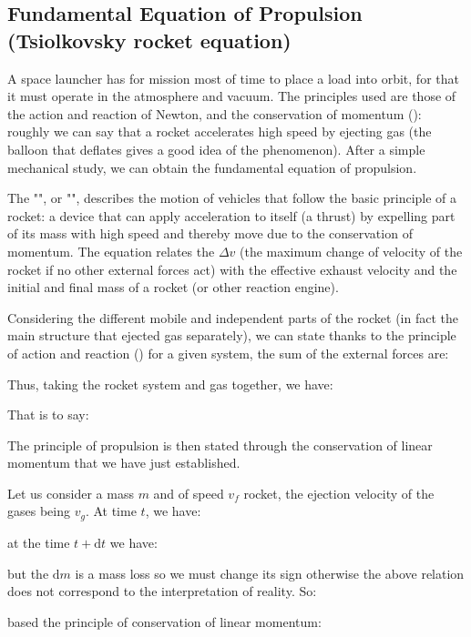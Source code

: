 	
	\subsection{Fundamental Equation of Propulsion (Tsiolkovsky rocket equation)}
	A space launcher has for mission most of time to place a load into orbit, for that it must operate in the atmosphere and vacuum. The principles used are those of the action and reaction of Newton, and the conservation of momentum (): roughly we can say that a rocket accelerates high speed by ejecting gas (the balloon that deflates gives a good idea of the phenomenon). After a simple mechanical study, we can obtain the fundamental equation of propulsion.
	
	The "", or "", describes the motion of vehicles that follow the basic principle of a rocket: a device that can apply acceleration to itself (a thrust) by expelling part of its mass with high speed and thereby move due to the conservation of momentum. The equation relates the $\Delta v$ (the maximum change of velocity of the rocket if no other external forces act) with the effective exhaust velocity and the initial and final mass of a rocket (or other reaction engine).
	
	Considering the different mobile and independent parts of the rocket (in fact the main structure that ejected gas separately), we can state thanks to the principle of action and reaction () for a given system, the sum of the external forces are:
	
	Thus, taking the rocket system and gas together, we have:
	
	That is to say:
	
	The principle of propulsion is then stated through the conservation of linear momentum that we have just established.
	
	Let us consider a mass $m$ and of speed $v_f$ rocket, the ejection velocity of the gases being $v_g$. At time $t$, we have:
	
	at the time $t+\mathrm{d}t$ we have:
	
	but the $\mathrm{d}m$ is a mass loss so we must change its sign otherwise the above relation does not correspond to the interpretation of reality. So:
	
	based the principle of conservation of linear momentum:
	
